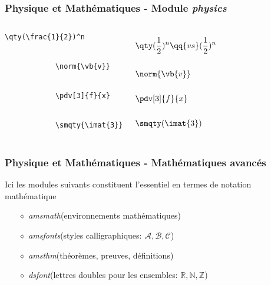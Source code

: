 \begin{frame}[fragile]
    \frametitle{Physique et Mathématiques - Module \textit{physics}}
    \begin{columns}
        \begin{lstlisting}[xleftmargin=-2cm]
            \qty(\frac{1}{2})^n


            \norm{\vb{v}}


            \pdv[3]{f}{x}


            \smqty{\imat{3}}
        \end{lstlisting}
        \vspace{-0.3cm}
        \begin{align*}
            &\qty(\frac{1}{2})^n\qq{vs}(\frac{1}{2})^n \\\\
            &\norm{\vb{v}} \\\\
            &\pdv[3]{f}{x} \\\\
            &\smqty(\imat{3})
        \end{align*}
    \end{columns}
\end{frame}

\begin{frame}
  \frametitle{Physique et Mathématiques - Mathématiques avancés}
  Ici les modules suivants constituent l'essentiel en termes de notation mathématique
  \vspace{0.3cm}
  \pause
    \begin{itemize}
        \item[$\diamond$] \textcolor{hard_green}{\textit{amsmath}}\footnotemark (environnements mathématiques)
        \item[$\diamond$] \textcolor{hard_green}{\textit{amsfonts}}\footnotemark (styles calligraphiques: $\mathcal{A}, \mathcal{B}, \mathcal{C}$)
        \item[$\diamond$] \textcolor{hard_green}{\textit{amsthm}}\footnotemark(théorèmes, preuves, définitions)
        \item[$\diamond$] \textcolor{hard_green}{\textit{dsfont}}\footnotemark (lettres doubles pour les ensembles: $\mathds{R}, \mathds{N}, \mathds{Z}$)
    \end{itemize}
\end{frame}


